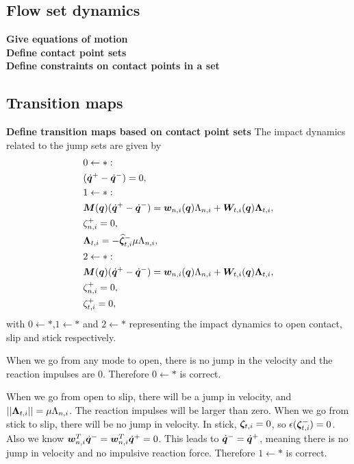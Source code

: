 \documentclass[../DC2017114Bouma.tex]{subfiles}
\begin{document}
\subsection{Flow set dynamics}\label{app:constraints}
\textbf{Give equations of motion}\\
\textbf{Define contact point sets}\\
\textbf{Define constraints on contact points in a set}\\

\subsection{Transition maps}\label{app:jumpmaps}
\textbf{Define transition maps based on contact point sets}
The impact dynamics related to the jump sets are given by
\begin{align}
&0\leftarrow \ast:\nonumber\\
&(\dot{{\boldsymbol{q}}}^+ - \dot{{\boldsymbol{q}}}^-) = 0,\label{eq:appjump1}\\
&1\leftarrow\ast:\nonumber\\
&{\boldsymbol{M}}({\boldsymbol{q}})(\dot{{\boldsymbol{q}}}^+ - \dot{{\boldsymbol{q}}}^-) = {\boldsymbol{w}}_{n,i}({\boldsymbol{q}})\Lambda_{n,i} + {\boldsymbol{W}}_{t,i}({\boldsymbol{q}})\boldsymbol{\Lambda}_{t,i},\label{eq:appjump2}\\
&\zeta_{n,i}^+=0,\label{eq:appjump3}\\
&\boldsymbol{\Lambda}_{t,i} = -\widehat{\boldsymbol{\zeta}}^-_{t,i}\mu\Lambda_{n,i},\label{eq:appjump4}\\
&2\leftarrow \ast:\nonumber\\
&{\boldsymbol{M}}({\boldsymbol{q}})(\dot{{\boldsymbol{q}}}^+ - \dot{{\boldsymbol{q}}}^-) = {\boldsymbol{w}}_{n,i}({\boldsymbol{q}})\Lambda_{n,i} + {\boldsymbol{W}}_{t,i}({\boldsymbol{q}})\boldsymbol{\Lambda}_{t,i},\label{eq:appjump5}\\
&\zeta_{n,i}^+=0,\label{eq:appjump6}\\
&\zeta_{t,i}^+= 0,\label{eq:appjump7}
\end{align}
with $0\leftarrow\ast$,$1\leftarrow\ast$ and $2\leftarrow\ast$ representing the impact dynamics to open contact, slip and stick respectively. 

When we go from any mode to open, there is no jump in the velocity and the reaction impulses are 0. Therefore $0\leftarrow \ast$ is correct.

When we go from open to slip, there will be a jump in velocity, and $||\boldsymbol{\Lambda}_{t,i}|| = \mu\Lambda_{n,i}$. The reaction impulses will be larger than zero. When we go from stick to slip, there will be no jump in velocity. In stick, $\boldsymbol{\zeta}_{t,i} =0$, so $\epsilon(\boldsymbol{\zeta}^-_{t,i}) = 0$. Also we know ${\boldsymbol{w}}_{n,i}^T\dot{{\boldsymbol{q}}}^- = {\boldsymbol{w}}_{n,i}^T\dot{{\boldsymbol{q}}}^+ = 0 $. This leads to $\dot{{\boldsymbol{q}}}^- = \dot{{\boldsymbol{q}}}^+$, meaning there is no jump in velocity and no impulsive reaction force. Therefore $1\leftarrow \ast$ is correct.
\end{document}
